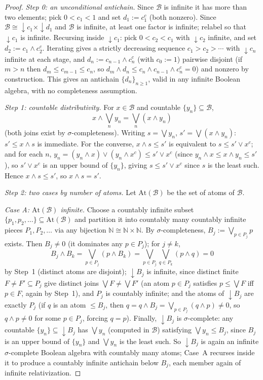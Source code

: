 \documentclass{amsart}
\theoremstyle{definition}
\theoremstyle{remark}
\newcommand{\nat}{\mathbb N}
\begin{document}
\begin{proof}
\emph{Step 0: an unconditional antichain.} Since $\mathcal B$ is infinite
it has more than two elements; pick $0<c_1<1$ and set $d_1:=c_1^c$ (both
nonzero). Since $\mathcal B\cong{\downarrow}c_1\times{\downarrow}d_1$ and
$\mathcal B$ is infinite, at least one factor is infinite; relabel so
that ${\downarrow}c_1$ is infinite. Recursing inside ${\downarrow}c_1$:
pick $0<c_2<c_1$ with ${\downarrow}c_2$ infinite, and set
$d_2:=c_1\wedge c_2^c$. Iterating gives a strictly decreasing sequence
$c_1>c_2>\cdots$ with ${\downarrow}c_n$ infinite at each stage, and
$d_n:=c_{n-1}\wedge c_n^c$ (with $c_0:=1$) pairwise disjoint (if $m>n$
then $d_m\leq c_{m-1}\leq c_n$, so
$d_m\wedge d_n\leq c_n\wedge c_{n-1}\wedge c_n^c=0$) and nonzero by
construction. This gives an antichain $\{d_n\}_{n\geq1}$, valid in any
infinite Boolean algebra, with no completeness assumption.

\emph{Step 1: countable distributivity.} For $x\in\mathcal B$ and
countable $\{y_n\}\subseteq\mathcal B$,
\[
x\wedge\bigvee_ny_n=\bigvee_n(x\wedge y_n)
\]
(both joins exist by $\sigma$-completeness). Writing $s=\bigvee y_n$,
$s'=\bigvee(x\wedge y_n)$: $s'\leq x\wedge s$ is immediate. For the
converse, $x\wedge s\leq s'$ is equivalent to $s\leq s'\vee x^c$; and for
each $n$, $y_n=(y_n\wedge x)\vee(y_n\wedge x^c)\leq s'\vee x^c$ (since
$y_n\wedge x\leq x\wedge y_n\leq s'$), so $s'\vee x^c$ is an upper bound
of $\{y_n\}$, giving $s\leq s'\vee x^c$ since $s$ is the least such.
Hence $x\wedge s\leq s'$, so $x\wedge s=s'$.

\emph{Step 2: two cases by number of atoms.} Let $\mathrm{At}(\mathcal
B)$ be the set of atoms of $\mathcal B$.

\emph{Case A: $\mathrm{At}(\mathcal B)$ infinite.} Choose a countably
infinite subset $\{p_1,p_2,\dots\}\subseteq\mathrm{At}(\mathcal B)$ and
partition it into countably many countably infinite pieces
$P_1,P_2,\dots$ via any bijection $\nat\cong\nat\times\nat$. By
$\sigma$-completeness, $B_j:=\bigvee_{p\in P_j}p$ exists. Then $B_j\neq0$
(it dominates any $p\in P_j$); for $j\neq k$,
\[
B_j\wedge B_k=\bigvee_{p\in P_j}(p\wedge B_k)
=\bigvee_{p\in P_j}\bigvee_{q\in P_k}(p\wedge q)=0
\]
by Step~1 (distinct atoms are disjoint); ${\downarrow}B_j$ is infinite,
since distinct finite $F\neq F'\subseteq P_j$ give distinct joins
$\bigvee F\neq\bigvee F'$ (an atom $p\in P_j$ satisfies $p\leq\bigvee F$
iff $p\in F$, again by Step~1), and $P_j$ is countably infinite; and the
atoms of ${\downarrow}B_j$ are exactly $P_j$ (if $q$ is an atom
$\leq B_j$, then $q=q\wedge B_j=\bigvee_{p\in P_j}(q\wedge p)\neq0$, so
$q\wedge p\neq0$ for some $p\in P_j$, forcing $q=p$). Finally,
${\downarrow}B_j$ is $\sigma$-complete: any countable
$\{y_n\}\subseteq{\downarrow}B_j$ has $\bigvee y_n$ (computed in
$\mathcal B$) satisfying $\bigvee y_n\leq B_j$, since $B_j$ is an upper
bound of $\{y_n\}$ and $\bigvee y_n$ is the least such. So
${\downarrow}B_j$ is again an infinite $\sigma$-complete Boolean algebra
with countably many atoms; Case~A recurses inside it to produce a
countably infinite antichain below $B_j$, each member again of infinite
relativization.


\end{proof}
\end{document}
